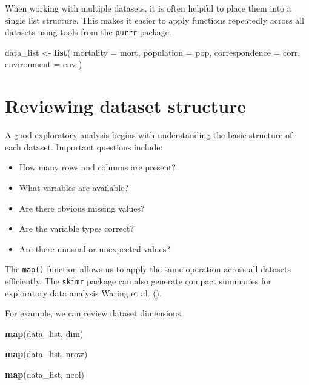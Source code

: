 \documentclass[
  11pt,
  oneside]{book}
\newenvironment{Shaded}{\begin{snugshade}}{\end{snugshade}}
\newcommand{\AttributeTok}[1]{\textcolor[rgb]{0.13,0.29,0.53}{#1}}
\newcommand{\FunctionTok}[1]{\textcolor[rgb]{0.13,0.29,0.53}{\textbf{#1}}}
\newcommand{\NormalTok}[1]{#1}
\newcommand{\OtherTok}[1]{\textcolor[rgb]{0.56,0.35,0.01}{#1}}
\providecommand{\tightlist}{%
  \setlength{\itemsep}{0pt}\setlength{\parskip}{0pt}}
\begin{document}
When working with multiple datasets, it is often helpful to place them into a single list structure. This makes it easier to apply functions repeatedly across all datasets using tools from the \texttt{purrr} package.

\begin{Shaded}
\begin{Highlighting}[]
\NormalTok{data\_list }\OtherTok{\textless{}{-}} \FunctionTok{list}\NormalTok{(}
  \AttributeTok{mortality =}\NormalTok{ mort,}
  \AttributeTok{population =}\NormalTok{ pop,}
  \AttributeTok{correspondence =}\NormalTok{ corr,}
  \AttributeTok{environment =}\NormalTok{ env}
\NormalTok{)}
\end{Highlighting}
\end{Shaded}

\section{Reviewing dataset structure}\label{reviewing-dataset-structure}

A good exploratory analysis begins with understanding the basic structure of each dataset. Important questions include:

\begin{itemize}
\tightlist
\item
  How many rows and columns are present?
\item
  What variables are available?
\item
  Are there obvious missing values?
\item
  Are the variable types correct?
\item
  Are there unusual or unexpected values?
\end{itemize}

The \texttt{map()} function allows us to apply the same operation across all datasets efficiently. The \texttt{skimr} package can also generate compact summaries for exploratory data analysis Waring et al. ().

For example, we can review dataset dimensions.

\begin{Shaded}
\begin{Highlighting}[]
\FunctionTok{map}\NormalTok{(data\_list, dim)}

\FunctionTok{map}\NormalTok{(data\_list, nrow)}

\FunctionTok{map}\NormalTok{(data\_list, ncol)}
\end{Highlighting}
\end{Shaded}
\end{document}
